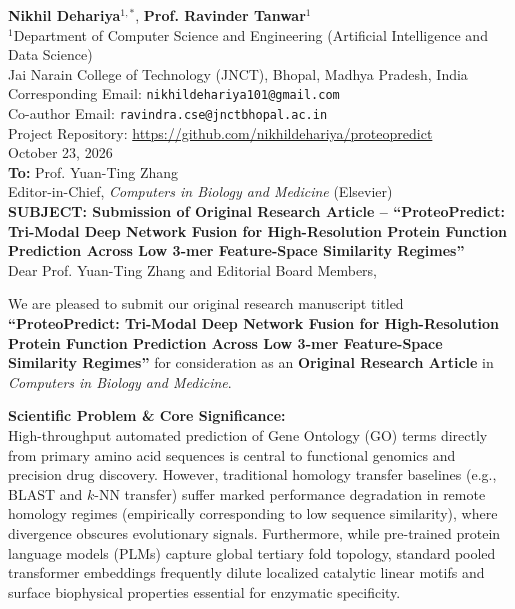 \documentclass[11pt]{article}
\begin{document}
\thispagestyle{empty}

\noindent\textbf{Nikhil Dehariya}$^{1,*}$, \textbf{Prof. Ravinder Tanwar}$^{1}$\\
$^{1}$Department of Computer Science and Engineering (Artificial Intelligence and Data Science)\\
Jai Narain College of Technology (JNCT), Bhopal, Madhya Pradesh, India\\
Corresponding Email: \texttt{nikhildehariya101@gmail.com}\\
Co-author Email: \texttt{ravindra.cse@jnctbhopal.ac.in}\\
Project Repository: \url{https://github.com/nikhildehariya/proteopredict}\\[1.5em]

\noindent October 23, 2026\\[1.5em]

\noindent\textbf{To:} Prof. Yuan-Ting Zhang\\
Editor-in-Chief, \textit{Computers in Biology and Medicine} (Elsevier)\\[1.5em]

\noindent\textbf{SUBJECT: Submission of Original Research Article -- ``ProteoPredict: Tri-Modal Deep Network Fusion for High-Resolution Protein Function Prediction Across Low 3-mer Feature-Space Similarity Regimes''}\\[1em]

\noindent Dear Prof. Yuan-Ting Zhang and Editorial Board Members,

We are pleased to submit our original research manuscript titled \textbf{``ProteoPredict: Tri-Modal Deep Network Fusion for High-Resolution Protein Function Prediction Across Low 3-mer Feature-Space Similarity Regimes''} for consideration as an \textbf{Original Research Article} in \textit{Computers in Biology and Medicine}.

\vspace{0.5em}
\noindent\textbf{Scientific Problem \& Core Significance:}\\
High-throughput automated prediction of Gene Ontology (GO) terms directly from primary amino acid sequences is central to functional genomics and precision drug discovery. However, traditional homology transfer baselines (e.g., BLAST and $k$-NN transfer) suffer marked performance degradation in remote homology regimes (empirically corresponding to low sequence similarity), where divergence obscures evolutionary signals. Furthermore, while pre-trained protein language models (PLMs) capture global tertiary fold topology, standard pooled transformer embeddings frequently dilute localized catalytic linear motifs and surface biophysical properties essential for enzymatic specificity.
\end{document}
